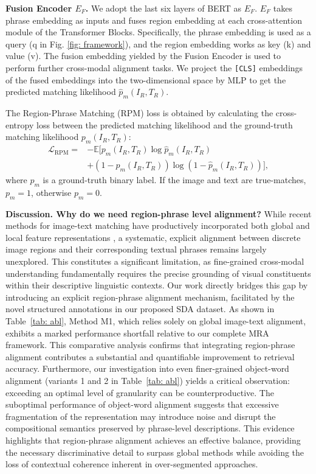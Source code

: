 \noindent\textbf{Fusion Encoder $E_F$.}
We adopt the last six layers of BERT as $E_F$. 
$E_F$ takes phrase embedding as inputs and fuses region embedding at each cross-attention module of the Transformer Blocks. 
Specifically, the phrase embedding is used as a query (q in Fig. \ref{fig: framework}), and the region embedding works as key (k) and value (v). 
The fusion embedding yielded by the Fusion Encoder is used to perform further cross-modal alignment tasks.
We project the \texttt{[CLS]} embeddings of the fused embeddings into the two-dimensional space by MLP to get the predicted matching likelihood $\hat{p}_m(I_R, T_R)$.

The Region-Phrase Matching (RPM) loss is obtained by calculating the cross-entropy loss between the predicted matching likelihood and the ground-truth matching likelihood $p_m(I_R, T_R)$:
\begin{equation}
\label{eq: L_PRM}
\begin{split}
\mathcal{L}_{\text{RPM}} =& - \mathbb{E}[p_{m}(I_R, T_R)\log \hat{p}_{m}(I_R, T_R)\\
&+ (1-p_{m}(I_R, T_R))\log (1-\hat{p}_{m}(I_R, T_R))],
\end{split}
\end{equation}
\noindent where $p_{m}$ is a ground-truth binary label. If the image and text are true-matches, $p_{m} = 1$, otherwise $p_{m} = 0$.


\noindent\textbf{Discussion. Why do we need region-phrase level alignment?}
While recent methods for image-text matching have productively incorporated both global and local feature representations \cite{jiang2023cross, bai2023rasa, yang2023towards, yan2022clip}, a systematic, explicit alignment between discrete image regions and their corresponding textual phrases remains largely unexplored. This constitutes a significant limitation, as fine-grained cross-modal understanding fundamentally requires the precise grounding of visual constituents within their descriptive linguistic contexts. Our work directly bridges this gap by introducing an explicit region-phrase alignment mechanism, facilitated by the novel structured annotations in our proposed SDA dataset.
As shown in Table~\ref{tab: abl}, Method M1, which relies solely on global image-text alignment, exhibits a marked performance shortfall relative to our complete MRA framework. This comparative analysis confirms that integrating region-phrase alignment contributes a substantial and quantifiable improvement to retrieval accuracy.
Furthermore, our investigation into even finer-grained object-word alignment (variants 1 and 2 in Table~\ref{tab: abl}) yields a critical observation: exceeding an optimal level of granularity can be counterproductive. The suboptimal performance of object-word alignment suggests that excessive fragmentation of the representation may introduce noise and disrupt the compositional semantics preserved by phrase-level descriptions. This evidence highlights that region-phrase alignment achieves an effective balance, providing the necessary discriminative detail to surpass global methods while avoiding the loss of contextual coherence inherent in over-segmented approaches.



